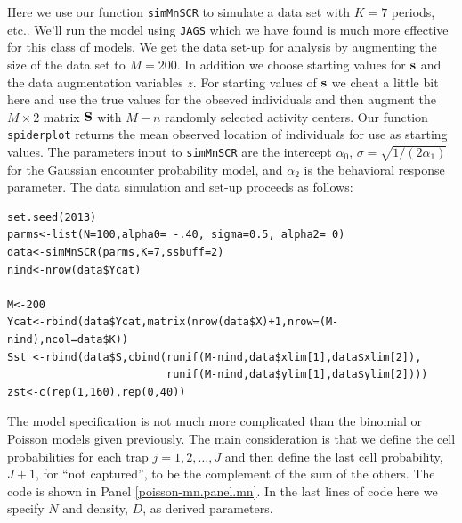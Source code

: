 Here we use our function \mbox{\tt simMnSCR} to simulate a data set
with $K=7$ periods, etc.. We'll run the model using \mbox{\tt JAGS} which
we have found is much more effective for this class of models.  We get
the data set-up for analysis by augmenting the size of the data set to
$M=200$. In addition we choose starting values for ${\bf s}$ and the
data augmentation variables $z$.  For starting values of ${\bf s}$ we cheat a little
bit here and use the true values for the obseved individuals and then
augment the $M \times 2$ matrix ${\bf S}$ with $M-n$ randomly selected activity
centers. Our function \mbox{\tt spiderplot} returns the mean observed
location of individuals for use as starting values.  
The parameters input to \mbox{\tt simMnSCR} are the
intercept $\alpha_{0}$, $\sigma = \sqrt{1/(2\alpha_{1})}$ for the
Gaussian encounter probability model, and $\alpha_{2}$ is the
behavioral response parameter. The data simulation and set-up proceeds
as follows:

{\small
\begin{verbatim}
set.seed(2013)
parms<-list(N=100,alpha0= -.40, sigma=0.5, alpha2= 0)
data<-simMnSCR(parms,K=7,ssbuff=2)
nind<-nrow(data$Ycat)

M<-200
Ycat<-rbind(data$Ycat,matrix(nrow(data$X)+1,nrow=(M-nind),ncol=data$K))
Sst <-rbind(data$S,cbind(runif(M-nind,data$xlim[1],data$xlim[2]),
                         runif(M-nind,data$ylim[1],data$ylim[2])))
zst<-c(rep(1,160),rep(0,40))
\end{verbatim}
}

The model specification is not much more complicated than the binomial
or Poisson models given previously. The main consideration is that we
define the cell probabilities for each trap $j=1,2,\dots,J$ and then
define the last cell probability, $J+1$, for ``not captured'', to be
the complement of the sum of the others. The code is shown in Panel
\ref{poisson-mn.panel.mn}.  In the last lines of code here we specify
$N$ and density, $D$, as derived parameters.

